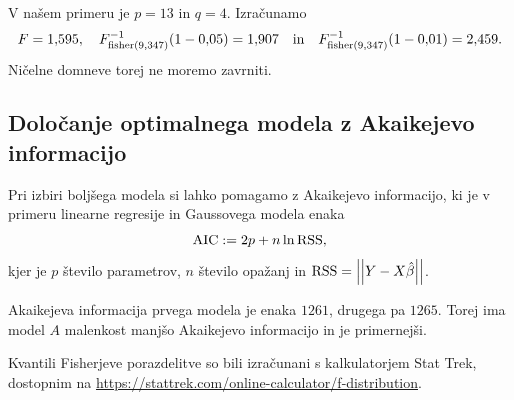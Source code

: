 \documentclass[12pt, a4paper]{article}
\begin{document}
V našem primeru je $p = 13$ in $q = 4$. Izračunamo 
\[
    F = 1{,}595, \quad
    F^{-1}_{\operatorname{fisher}(9,347)}(1-0{,}05) = 1{,}907 \quad \text{in} \quad
    F^{-1}_{\operatorname{fisher}(9,347)}(1-0{,}01) = 2{,}459.
\]
Ničelne domneve torej ne moremo zavrniti.

\subsection*{Določanje optimalnega modela z Akaikejevo informacijo}

Pri izbiri boljšega modela si lahko pomagamo z Akaikejevo informacijo, 
ki je v primeru linearne regresije in Gaussovega modela enaka
\[
    \operatorname{AIC} := 2p + n \ln \operatorname{RSS},
\]
kjer je $p$ število parametrov, $n$ število opažanj in $\operatorname{RSS} = \left\lvert\left\lvert Y - X\hat \beta\right\rvert\right\rvert$.

Akaikejeva informacija prvega modela je enaka $1261$,
drugega pa $1265$. Torej ima model $A$ malenkost
manjšo Akaikejevo informacijo in je primernejši.

\newpage

\nocite{*}
\printbibliography
{}

Kvantili Fisherjeve porazdelitve so bili izračunani s kalkulatorjem Stat Trek,
dostopnim na \url{https://stattrek.com/online-calculator/f-distribution}.
\end{document}
